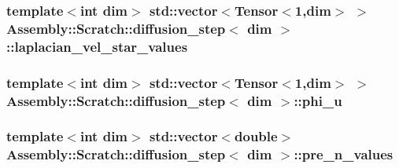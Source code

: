 \subsubsection[{laplacian\+\_\+vel\+\_\+star\+\_\+values}]{\setlength{\rightskip}{0pt plus 5cm}template$<$int dim$>$ std\+::vector$<$Tensor$<$1,dim$>$ $>$ {\bf Assembly\+::\+Scratch\+::diffusion\+\_\+step}$<$ dim $>$\+::laplacian\+\_\+vel\+\_\+star\+\_\+values}\label{struct_assembly_1_1_scratch_1_1diffusion__step_af7bfee637fae1cadfde75192f16c0684}
\hypertarget{struct_assembly_1_1_scratch_1_1diffusion__step_a7aeba7bef458d2c451ec2ca3d0ddbd0f}{}
\subsubsection[{phi\+\_\+u}]{\setlength{\rightskip}{0pt plus 5cm}template$<$int dim$>$ std\+::vector$<$Tensor$<$1,dim$>$ $>$ {\bf Assembly\+::\+Scratch\+::diffusion\+\_\+step}$<$ dim $>$\+::phi\+\_\+u}\label{struct_assembly_1_1_scratch_1_1diffusion__step_a7aeba7bef458d2c451ec2ca3d0ddbd0f}
\hypertarget{struct_assembly_1_1_scratch_1_1diffusion__step_ae1586636fe3416c069fe1efaa51c80f2}{}
\subsubsection[{pre\+\_\+n\+\_\+values}]{\setlength{\rightskip}{0pt plus 5cm}template$<$int dim$>$ std\+::vector$<$double$>$ {\bf Assembly\+::\+Scratch\+::diffusion\+\_\+step}$<$ dim $>$\+::pre\+\_\+n\+\_\+values}\label{struct_assembly_1_1_scratch_1_1diffusion__step_ae1586636fe3416c069fe1efaa51c80f2}
\hypertarget{struct_assembly_1_1_scratch_1_1diffusion__step_a5f7d1700139f21792a1107ede3903cf5}{}

